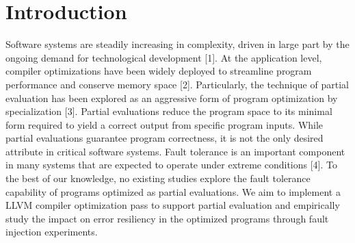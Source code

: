 \section{Introduction}

Software systems are steadily increasing in complexity, driven in large part by the ongoing demand for technological development [1]. 
At the application level, compiler optimizations have been widely deployed to streamline program performance and conserve memory space [2]. 
Particularly, the technique of partial evaluation has been explored as an aggressive form of program optimization by specialization [3].
Partial evaluations reduce the program space to its minimal form required to yield a correct output from specific program inputs.
While partial evaluations guarantee program correctness, it is not the only desired attribute in critical software systems.
Fault tolerance is an important component in many systems that are expected to operate under extreme conditions [4].
To the best of our knowledge, no existing studies explore the fault tolerance capability of programs optimized as partial evaluations.
We aim to implement a LLVM compiler optimization pass to support partial evaluation and empirically study the impact on error resiliency in the optimized programs through fault injection experiments.

